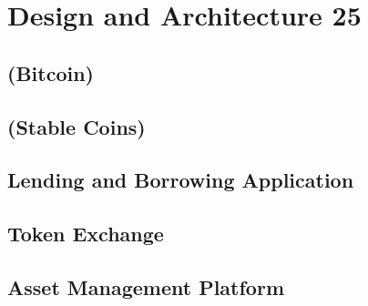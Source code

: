 \chapter{Design and Architecture 25}
\label{cha:DesignArchitecture}

\section{(Bitcoin)}
\section{(Stable Coins)}
\section{Lending and Borrowing Application}
\section{Token Exchange}
\section{Asset Management Platform}